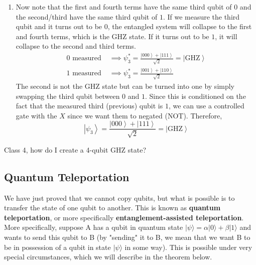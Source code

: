 \documentclass{article}
\newcommand{\ket}[1]{\ensuremath{\left|#1\right\rangle}}
\newcounter{question}[section]
\newcounter{theorem}[section]
\begin{document}
\begin{theorem}
\begin{enumerate}
\begin{align}
          \end{align}
        \item Now note that the first and fourth terms have the same third qubit of $0$ and the second/third have the same third qubit of $1$. If we measure the third qubit and it turns out to be $0$, the entangled system will collapse to the first and fourth terms, which is the GHZ state. If it turns out to be $1$, it will collapse to the second and third terms. 
          \begin{align} 
            0 \text{ measured } & \implies \psi_3^\ast = \frac{\ket{000} + \ket{111}}{\sqrt{2}} = \ket{\mathrm{GHZ}} \\
            1 \text{ measured } & \implies \psi_3^\ast = \frac{\ket{001} + \ket{110}}{\sqrt{2}}
          \end{align}
        The second is not the GHZ state but can be turned into one by simply swapping the third qubit between $0$ and $1$. Since this is conditioned on the fact that the measured third (previous) qubit is $1$, we can use a controlled gate with the $X$ since we want them to negated (NOT). Therefore, 
        \begin{equation} 
          \ket{\psi_3} = \frac{\ket{000} + \ket{111}}{\sqrt{2}} = \ket{\mathrm{GHZ}} 
        \end{equation}
      \end{enumerate}
    \end{theorem}

    \begin{question}[To Do] 
      Class 4, how do I create a 4-qubit GHZ state? 
    \end{question}

  \subsection{Quantum Teleportation} 

    We have just proved that we cannot copy qubits, but what is possible is to transfer the state of one qubit to another. This is known as \textbf{quantum teleportation}, or more specifically \textbf{entanglement-assisted teleportation}. More specifically, suppose A has a qubit in quantum state $|\psi \rangle = \alpha |0\rangle + \beta |1 \rangle$ and wants to send this qubit to B (by "sending" it to B, we mean that we want B to be in possession of a qubit in state $|\psi \rangle$ in some way). This is possible under very special circumstances, which we will describe in the theorem below.  
\end{document}
